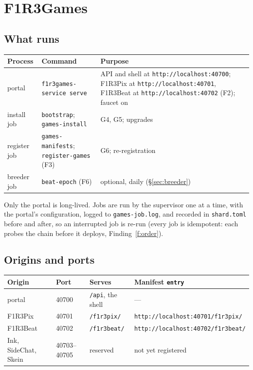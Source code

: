 \documentclass[11pt]{article}
\theoremstyle{definition}
\theoremstyle{remark}
\newcommand{\code}[1]{\texttt{#1}}
\newcommand{\Gm}{F1R3Games}
\begin{document}
\section{\Gm{}}\label{sec:games}

\subsection{What runs}

\begin{center}\small
\renewcommand{\arraystretch}{1.15}
\begin{tabularx}{\linewidth}{@{}p{3.0cm}p{3.7cm}X@{}}
\toprule
Process & Command & Purpose\\
\midrule
portal & \code{f1r3games-service serve} & API and shell at \code{http://localhost:40700}; F1R3Pix at \code{http://localhost:40701}, F1R3Beat at \code{http://localhost:40702} (F2); faucet on\\
install job & \code{bootstrap}; \code{games-install} & G4, G5; upgrades\\
register job & \code{games-manifests}; \code{register-games} (F3) & G6; re-registration\\
breeder job & \code{beat-epoch} (F6) & optional, daily (\S\ref{sec:breeder})\\
\bottomrule
\end{tabularx}
\end{center}

\noindent
Only the portal is long-lived. Jobs are run by the supervisor one at a time, with the
portal's configuration, logged to \code{games-job.log}, and recorded in
\code{shard.toml} before and after, so an interrupted job is re-run (every job is
idempotent: each probes the chain before it deploys, Finding~\ref{f:order}).

\subsection{Origins and ports}\label{sec:gports}

\begin{center}\small
\renewcommand{\arraystretch}{1.1}
\begin{tabular}{@{}llll@{}}
\toprule
Origin & Port & Serves & Manifest \code{entry}\\
\midrule
portal & 40700 & \code{/api}, the shell & ---\\
F1R3Pix & 40701 & \code{/f1r3pix/} & \code{http://localhost:40701/f1r3pix/}\\
F1R3Beat & 40702 & \code{/f1r3beat/} & \code{http://localhost:40702/f1r3beat/}\\
Ink, SideChat, Skein & 40703--40705 & reserved & not yet registered\\
\bottomrule
\end{tabular}
\end{center}
\end{document}
